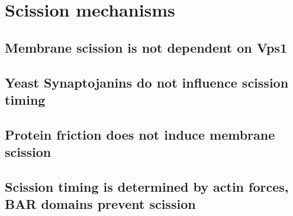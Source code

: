 \section{Scission mechanisms}

	\subsection{Membrane scission is not dependent on Vps1}
	\subsection{Yeast Synaptojanins do not influence scission timing}
	\subsection{Protein friction does not induce membrane scission }
	\subsection{Scission timing is determined by actin forces, \\
		BAR domains prevent scission}